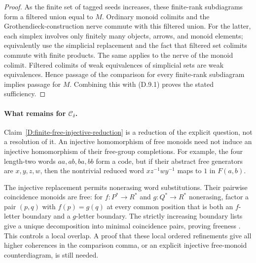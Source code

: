 \begin{proof}
As the finite set of tagged seeds increases, these finite-rank
subdiagrams form a filtered union equal to $M$. Ordinary monoid
colimits and the Grothendieck-construction nerve commute with this
filtered union. For the latter, each simplex involves only finitely
many objects, arrows, and monoid elements; equivalently use the
simplicial replacement and the fact that filtered set colimits
commute with finite products. The same applies to the nerve of
the monoid colimit. Filtered colimits of weak equivalences of
simplicial sets are weak equivalences. Hence passage of the
comparison for every finite-rank subdiagram implies passage for
$M$. Combining this with (D.9.1) proves the stated sufficiency.
\end{proof}

\paragraph{What remains for $\mathcal C_\delta$.}
Claim~\ref{D:finite-free-injective-reduction} is a reduction of the
explicit question, not a resolution of it. An injective homomorphism
of free monoids need not induce an injective homomorphism of their
free-group completions. For example, the four length-two words
$aa,ab,ba,bb$ form a code, but if their abstract free generators are
$x,y,z,w$, then the nontrivial reduced word
$xz^{-1}wy^{-1}$ maps to $1$ in $F(a,b)$.

The injective replacement permits nonerasing word substitutions.
Their pairwise coincidence monoids are free: for
$f:P^*\to R^*$ and $g:Q^*\to R^*$ nonerasing, factor a pair
$(p,q)$ with $f(p)=g(q)$ at every common position that is both an
$f$-letter boundary and a $g$-letter boundary. The strictly increasing
boundary lists give a unique decomposition into minimal coincidence
pairs, proving freeness
\citep[Section~3, Lemma~3, revised version]{DGHolub2003}.
This controls a local overlap. A proof that these local ordered
refinements give all higher coherences in the comparison comma, or
an explicit injective free-monoid counterdiagram, is still needed.
